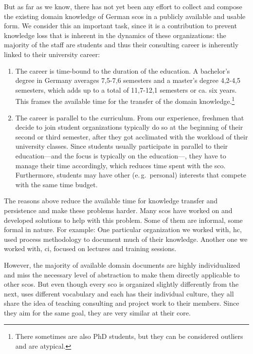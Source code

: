 \documentclass[a4paper, DIV=13, BCOR=0cm]{scrbook}
\newcommand{\eg}{e.\,g.\ }
\begin{document}
But as far as we know, there has not yet been any effort to collect and compose the existing domain knowledge of German \glspl{sco} in a publicly available and usable form. We consider this an important task, since it is a contribution to prevent knowledge loss that is inherent in the dynamics of these organizations: the majority of the staff are students and thus their consulting career is inherently linked to their university career:

\begin{enumerate}
	\item The career is time-bound to the duration of the education. A bachelor's degree in Germany averages 7,5-7,6 semesters and a master's degree 4,2-4,5 semesters, which adds up to a total of 11,7-12,1 semesters or ca. six years. \cite{stabu2019a} This frames the available time for the transfer of the domain knowledge.\footnote{There sometimes are also PhD students, but they can be considered outliers and are atypical.}
	\item The career is parallel to the curriculum. From our experience, freshmen that decide to join student organizations typically do so at the beginning of their second or third semester, after they got acclimated with the workload of their university classes. Since students usually participate in parallel to their education---and the focus is typically on the education\mbox{---,} they have to manage their time accordingly, which reduces time spent with the \gls{sco}. Furthermore, students may have other (\eg personal) interests that compete with the same time budget.
\end{enumerate}

The reasons above reduce the available time for knowledge transfer and persistence and make these problems harder. Many \glspl{sco} have worked on and developed solutions to help with this problem. Some of them are informal, some formal in nature. For example: One particular organization we worked with, \gls{hc}, used process methodology to document much of their knowledge. Another one we worked with, \gls{ci}, focused on lectures and training sessions.

However, the majority of available domain documents are highly individualized and miss the necessary level of abstraction to make them directly applicable to other \glspl{sco}. But even though every \gls{sco} is organized slightly differently from the next, uses different vocabulary and each has their individual culture, they all share the idea of teaching consulting and project work to their members. Since they aim for the same goal, they are very similar at their core.
\end{document}
